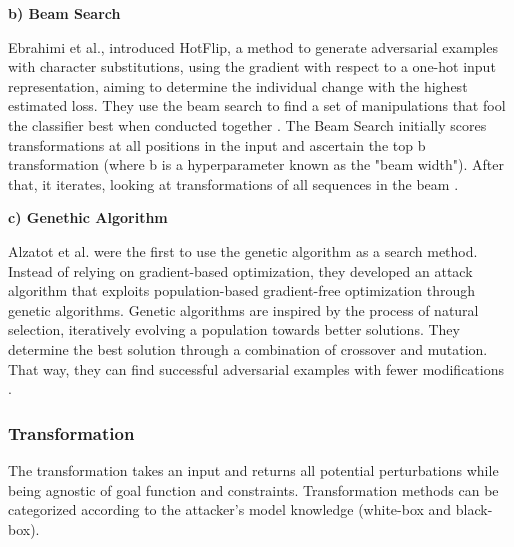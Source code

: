     \textbf{b) Beam Search}
    
        Ebrahimi et al., introduced HotFlip, a method to generate adversarial examples with character substitutions, using the gradient with respect to a one-hot input representation, aiming to determine the individual change with the highest estimated loss. They use the beam search to find a set of manipulations that fool the classifier best when conducted together \cite{ebrahimi2017hotflip}. The Beam Search initially scores transformations at all positions in the input and ascertain the top b transformation (where b is a hyperparameter known as the "beam width"). After that, it iterates, looking at transformations of all sequences in the beam \cite{tillmann2003word}. 
        
    \textbf{c) Genethic Algorithm}
    
        Alzatot et al. were the first to use the genetic algorithm as a search method. Instead of relying on gradient-based optimization, they developed an attack algorithm that exploits population-based gradient-free optimization through genetic algorithms. Genetic algorithms are inspired by the process of natural selection, iteratively evolving a population towards better solutions. They determine the best solution through a combination of crossover and mutation. That way, they can find successful adversarial examples with fewer modifications \cite{alzantot2018generating}.
        
        
\subsubsection{Transformation}
\label{sec:transformation}
    The transformation takes an input and returns all potential perturbations while being agnostic of goal function and constraints. Transformation methods can be categorized according to the attacker's model knowledge (white-box and black-box).

